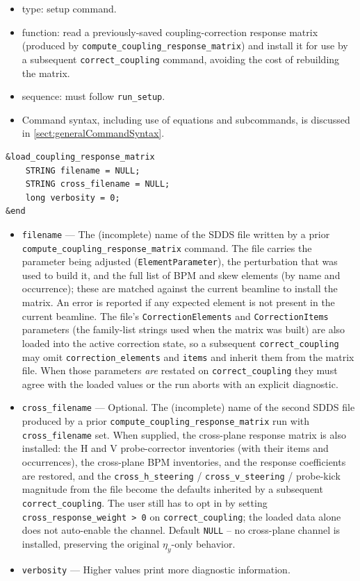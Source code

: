 \documentclass[11pt]{article}
\begin{document}
\begin{itemize}
\item type: setup command.
\item function: read a previously-saved coupling-correction response matrix
  (produced by \verb|compute_coupling_response_matrix|) and install it for
  use by a subsequent \verb|correct_coupling| command, avoiding the cost of
  rebuilding the matrix.
\item sequence: must follow \verb|run_setup|.
\item Command syntax, including use of equations and subcommands, is discussed in \ref{sect:generalCommandSyntax}.
\end{itemize}

\begin{verbatim}
&load_coupling_response_matrix
    STRING filename = NULL;
    STRING cross_filename = NULL;
    long verbosity = 0;
&end
\end{verbatim}

\begin{itemize}
\item \verb|filename| --- The (incomplete) name of the SDDS file written by
  a prior \verb|compute_coupling_response_matrix| command.  The file
  carries the parameter being adjusted (\verb|ElementParameter|), the
  perturbation that was used to build it, and the full list of BPM and
  skew elements (by name and occurrence); these are matched against the
  current beamline to install the matrix.  An error is reported if any
  expected element is not present in the current beamline.
  The file's \verb|CorrectionElements| and \verb|CorrectionItems|
  parameters (the family-list strings used when the matrix was built)
  are also loaded into the active correction state, so a subsequent
  \verb|correct_coupling| may omit \verb|correction_elements| and
  \verb|items| and inherit them from the matrix file.  When those
  parameters {\em are} restated on \verb|correct_coupling| they must
  agree with the loaded values or the run aborts with an explicit
  diagnostic.
\item \verb|cross_filename| --- Optional.  The (incomplete) name of the
  second SDDS file produced by a prior
  \verb|compute_coupling_response_matrix| run with \verb|cross_filename|
  set.  When supplied, the cross-plane response matrix is also installed:
  the H and V probe-corrector inventories (with their items and
  occurrences), the cross-plane BPM inventories, and the response
  coefficients are restored, and the \verb|cross_h_steering| /
  \verb|cross_v_steering| / probe-kick magnitude from the file become the
  defaults inherited by a subsequent \verb|correct_coupling|.  The user
  still has to opt in by setting \verb|cross_response_weight > 0| on
  \verb|correct_coupling|; the loaded data alone does not auto-enable
  the channel.  Default \verb|NULL| -- no cross-plane channel is
  installed, preserving the original $\eta_y$-only behavior.
\item \verb|verbosity| --- Higher values print more diagnostic information.
\end{itemize}
\end{document}
